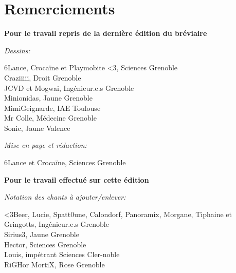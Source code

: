 \documentclass[a5paper,twoside,openright]{article} %
\begin{document}
\breakpage
\section*{Remerciements} \label{Remerciements}
\noindent

\textbf{Pour le travail repris de la dernière édition du bréviaire}

\textit{Dessins:}
\begin{addmargin}[1em]{2em}%
6Lance, Crocaïne et Playmobite <3{\color{falGrey!60!black}, Sciences Grenoble}
\\Craziiiii{\color{falGrey!60!black}, Droit Grenoble}
\\JCVD et Mogwai{\color{falGrey!60!black}, Ingénieur.e.s Grenoble}
\\Minionidas{\color{falGrey!60!black}, Jaune Grenoble}
\\MimiGeignarde{\color{falGrey!60!black}, IAE Toulouse}
\\Mr Colle{\color{falGrey!60!black}, Médecine Grenoble}
\\Sonic{\color{falGrey!60!black}, Jaune Valence}\\
\end{addmargin}

\textit{Mise en page et rédaction:}
\begin{addmargin}[1em]{2em}%
6Lance et Crocaïne{\color{falGrey!60!black}, Sciences Grenoble}\\
\end{addmargin}

\bigskip
\textbf{Pour le travail effectué sur cette édition}

\textit{Notation des chants à ajouter/enlever:}
\begin{addmargin}[1em]{2em}%
<3Beer, Lucie, Spatt0une, Calondorf, Panoramix, Morgane, Tiphaine et Gringotts{\color{falGrey!60!black}, Ingénieur.e.s Grenoble}
\\Sirius3{\color{falGrey!60!black}, Jaune Grenoble}
\\Hector{\color{falGrey!60!black}, Sciences Grenoble}
\\Louis{\color{falGrey!60!black}, impétrant Sciences Cler-noble}
\\RiGHor MortiX{\color{falGrey!60!black}, Rose Grenoble}\\
\end{addmargin}
\end{document}
